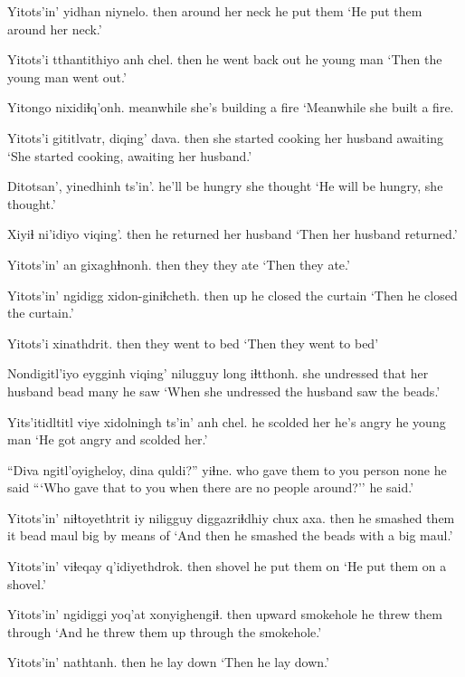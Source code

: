 \documentclass[12pt]{article}
\begin{document}
\gll Yitots'in' yidhan niynelo.
then {around her neck} {he put them }
\glt `He put them around her neck.'
\glend

\gll Yitots'i tthantithiyo anh chel.
then  {he went back out} he {young man}
\glt `Then the young man went out.'
\glend

\gll Yitongo nixidiɬq'onh. 
meanwhile {she's building a fire}
\glt `Meanwhile she built a fire.
\glend

\gll Yitots'i gititlvatr,  diqing' dava.
then  {she started cooking} {her husband} awaiting
\glt `She started cooking, awaiting her husband.'
\glend

\gll Ditotsan',  yinedhinh ts'in'.
{he'll be hungry} {she thought}
\glt `He will be hungry, she thought.'
\glend

\gll Xiyiɬ ni'idiyo viqing'.
then {he returned} {her husband}
\glt `Then her husband returned.'
\glend

\gll Yitots'in' an gixaghɬnonh.
then  they {they ate}
\glt `Then they ate.'
\glend

\gll Yitots'in' ngidigg xidon-giniɬcheth.
then  up  {he closed the curtain}
\glt `Then he closed the curtain.'
\glend

\gll Yitots'i xinathdrit.
then  {they went to bed}
\glt `Then they went to bed'
\glend

\gll Nondigitl'iyo eygginh viqing' nilugguy long iɬtthonh.
{she undressed}  that  {her husband} bead  many {he saw}
\glt `When she undressed the husband saw the beads.'
\glend

\gll Yits'itidltitl {viye xidolningh} ts'in' anh chel.
{he scolded her} {he's angry} {} he {young man}
\glt `He got angry and scolded her.'
\glend

\gll ``Diva ngitl'oyigheloy, dina quldi?'' yiɬne.
who {gave them to you} person none {he said}
\glt ```Who gave that to you when there are no people around?'' he said.'
\glend

\gll Yitots'in' niɬtoyethtrit iy niligguy diggazriɬdhiy chux axa.
then  {he smashed them} it bead maul  big {by means of}
\glt `And then he smashed the beads with a big maul.'
\glend

\gll Yitots'in' viɬeqay q'idiyethdrok.
then  shovel  {he put them on}
\glt `He put them on a shovel.'
\glend

\gll Yitots'in' ngidiggi yoq'at xonyighengiɬ.
then  upward  smokehole {he threw them through}
\glt `And he threw them up through the smokehole.'
\glend

\gll Yitots'in' nathtanh.
then  {he lay down}
\glt `Then he lay down.'
\glend
\end{document}
